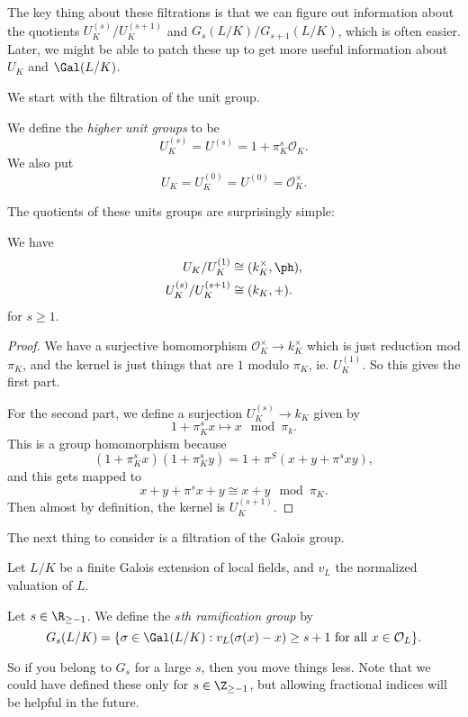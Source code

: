 \documentclass[a4paper]{article}
\begin{document}
The key thing about these filtrations is that we can figure out information about the quotients $U_K^{(s)}/U_K^{(s + 1)}$ and $G_s(L/K)/G_{s + 1}(L/K)$, which is often easier. Later, we might be able to patch these up to get more useful information about $U_K$ and $\Gal(L/K)$.

We start with the filtration of the unit group.

\begin{defi}
  We define the \emph{higher unit groups} to be
  \[
    U_K^{(s)} = U^{(s)} = 1 + \pi_K^s\mathcal{O}_K.
  \]
  We also put
  \[
    U_K = U_K^{(0)} = U^{(0)} = \mathcal{O}_K^\times.
  \]
\end{defi}

The quotients of these units groups are surprisingly simple:
\begin{prop}
  We have
  \begin{align*}
    U_K/U_K^{(1)} &\cong (k_K^\times, \ph),\\
    U_K^{(s)}/U_K^{(s + 1)} &\cong (k_K, +).
  \end{align*}
  for $s \geq 1$.
\end{prop}

\begin{proof}
  We have a surjective homomorphism $\mathcal{O}_K^\times \to k_K^\times$ which is just reduction mod $\pi_K$, and the kernel is just things that are $1$ modulo $\pi_K$, ie. $U_K^{(1)}$. So this gives the first part.

  For the second part, we define a surjection $U_K^{(s)} \to k_K$ given by
  \[
    1 + \pi_K^s x \mapsto x \mod \pi_k.
  \]
  This is a group homomorphism because
  \[
    (1 + \pi_K^s x)(1 + \pi_K^s y) = 1 + \pi^S(x + y + \pi^s xy),
  \]
  and this gets mapped to
  \[
    x + y + \pi^s x + y \cong x + y \mod \pi_K.
  \]
  Then almost by definition, the kernel is $U_K^{(s + 1)}$.
\end{proof}

The next thing to consider is a filtration of the Galois group.
\begin{defi}
  Let $L/K$ be a finite Galois extension of local fields, and $v_L$ the normalized valuation of $L$.

  Let $s \in \R_{\geq -1}$. We define the \emph{$s$th ramification group} by
  \[
    G_s(L/K) = \{\sigma \in \Gal(L/K): v_L(\sigma(x) - x) \geq s + 1\text{ for all }x \in \mathcal{O}_L\}.
  \]
\end{defi}
So if you belong to $G_s$ for a large $s$, then you move things less. Note that we could have defined these only for $s \in \Z_{\geq -1}$, but allowing fractional indices will be helpful in the future.
\end{document}
